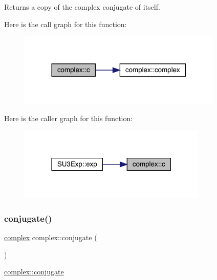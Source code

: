 \begin{DoxyReturn}{Returns}
a copy of the complex conjugate of itself. 
\end{DoxyReturn}
Here is the call graph for this function\+:\nopagebreak
\begin{figure}[H]
\begin{center}
\leavevmode
\includegraphics[width=276pt]{classcomplex_a4741546b5617d11e87ee7831067c84c5_cgraph}
\end{center}
\end{figure}
Here is the caller graph for this function\+:\nopagebreak
\begin{figure}[H]
\begin{center}
\leavevmode
\includegraphics[width=254pt]{classcomplex_a4741546b5617d11e87ee7831067c84c5_icgraph}
\end{center}
\end{figure}
\mbox{\label{classcomplex_af21a3dae4577a3aab8e1105a1b919b81}} 
\subsubsection{\texorpdfstring{conjugate()}{conjugate()}}
{\footnotesize\ttfamily \mbox{\hyperlink{classcomplex}{complex}} complex\+::conjugate (\begin{DoxyParamCaption}{ }\end{DoxyParamCaption})}



\mbox{\hyperlink{classcomplex_af21a3dae4577a3aab8e1105a1b919b81}{complex\+::conjugate}} 

